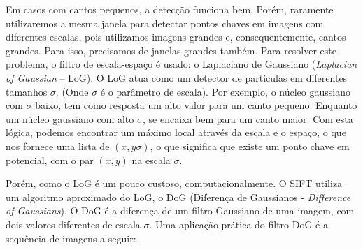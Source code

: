 Em casos com cantos pequenos, a detecção funciona bem. Porém, raramente utilizaremos a mesma janela para detectar pontos chaves em imagens com diferentes escalas, pois utilizamos imagens grandes e, consequentemente, cantos grandes. Para isso, precisamos de janelas grandes também. Para resolver este problema, o filtro de escala-espaço é usado: o Laplaciano de Gaussiano ({\it Laplacian of Gaussian} --  LoG). O LoG atua como um detector de particulas em diferentes tamanhos $\sigma$. (Onde $\sigma$ é o parâmetro de escala). Por exemplo, o núcleo gaussiano com $\sigma$ baixo, tem como resposta um alto valor para um canto pequeno. Enquanto um núcleo gaussiano com alto $\sigma$, se encaixa bem para um canto maior. Com esta lógica, podemos encontrar um máximo local através da escala e o espaço, o que nos fornece uma lista de $(x,y \sigma)$, o que significa que existe um ponto chave em potencial, com o par $(x,y)$ na escala $\sigma$.


Porém, como o LoG é um pouco custoso, computacionalmente. O SIFT utiliza um algoritmo aproximado do LoG, o DoG (Diferença de Gaussianos - {\it Difference of Gaussians}). O DoG é a diferença de um filtro Gaussiano de uma imagem, com dois valores diferentes de escala $\sigma$. 
Uma aplicação prática do filtro DoG é a sequência de imagens a seguir:

